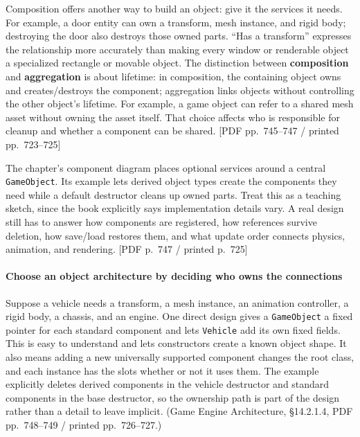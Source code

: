 Composition offers another way to build an object: give it the services it needs. For example, a door entity can own a transform, mesh instance, and rigid body; destroying the door also destroys those owned parts. ``Has a transform'' expresses the relationship more accurately than making every window or renderable object a specialized rectangle or movable object. The distinction between \textbf{composition} and \textbf{aggregation} is about lifetime: in composition, the containing object owns and creates/destroys the component; aggregation links objects without controlling the other object's lifetime. For example, a game object can refer to a shared mesh asset without owning the asset itself. That choice affects who is responsible for cleanup and whether a component can be shared. {[}PDF pp.~745--747 / printed pp.~723--725{]}

The chapter's component diagram places optional services around a central \texttt{GameObject}. Its example lets derived object types create the components they need while a default destructor cleans up owned parts. Treat this as a teaching sketch, since the book explicitly says implementation details vary. A real design still has to answer how components are registered, how references survive deletion, how save/load restores them, and what update order connects physics, animation, and rendering. {[}PDF p.~747 / printed p.~725{]}

\paragraph{Choose an object architecture by deciding who owns the connections}\label{06-engine-ii-ch041-choose-an-object-architecture-by-deciding-who-owns-the-connections}

Suppose a vehicle needs a transform, a mesh instance, an animation controller, a rigid body, a chassis, and an engine. One direct design gives a \texttt{GameObject} a fixed pointer for each standard component and lets \texttt{Vehicle} add its own fixed fields. This is easy to understand and lets constructors create a known object shape. It also means adding a new universally supported component changes the root class, and each instance has the slots whether or not it uses them. The example explicitly deletes derived components in the vehicle destructor and standard components in the base destructor, so the ownership path is part of the design rather than a detail to leave implicit. (Game Engine Architecture, §14.2.1.4, PDF pp.~748--749 / printed pp.~726--727.)

